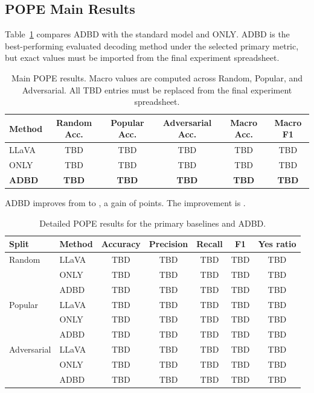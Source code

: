 \subsection{POPE Main Results}

Table~\ref{tab:main_results} compares ADBD with the standard model and ONLY. ADBD is the best-performing evaluated decoding method under the selected primary metric, but exact values must be imported from the final experiment spreadsheet.

\begin{table}[t]
\centering
\small
\setlength{\tabcolsep}{5pt}
\begin{tabular}{lccccc}
\toprule
Method & Random Acc. & Popular Acc. & Adversarial Acc. & Macro Acc. & Macro F1 \\
\midrule
LLaVA & TBD & TBD & TBD & TBD & TBD \\
ONLY  & TBD & TBD & TBD & TBD & TBD \\
\textbf{ADBD} & \textbf{TBD} & \textbf{TBD} & \textbf{TBD} & \textbf{TBD} & \textbf{TBD} \\
\bottomrule
\end{tabular}
\caption{Main POPE results. Macro values are computed across Random, Popular, and Adversarial. All TBD entries must be replaced from the final experiment spreadsheet.}
\label{tab:main_results}
\end{table}

ADBD improves  from  to , a gain of  points. The improvement is . 

\begin{table}[t]
\centering
\small
\setlength{\tabcolsep}{4pt}
\begin{tabular}{llccccc}
\toprule
Split & Method & Accuracy & Precision & Recall & F1 & Yes ratio \\
\midrule
Random & LLaVA & TBD & TBD & TBD & TBD & TBD \\
       & ONLY  & TBD & TBD & TBD & TBD & TBD \\
       & ADBD  & TBD & TBD & TBD & TBD & TBD \\
\midrule
Popular & LLaVA & TBD & TBD & TBD & TBD & TBD \\
        & ONLY  & TBD & TBD & TBD & TBD & TBD \\
        & ADBD  & TBD & TBD & TBD & TBD & TBD \\
\midrule
Adversarial & LLaVA & TBD & TBD & TBD & TBD & TBD \\
            & ONLY  & TBD & TBD & TBD & TBD & TBD \\
            & ADBD  & TBD & TBD & TBD & TBD & TBD \\
\bottomrule
\end{tabular}
\caption{Detailed POPE results for the primary baselines and ADBD.}
\label{tab:detailed_results}
\end{table}

